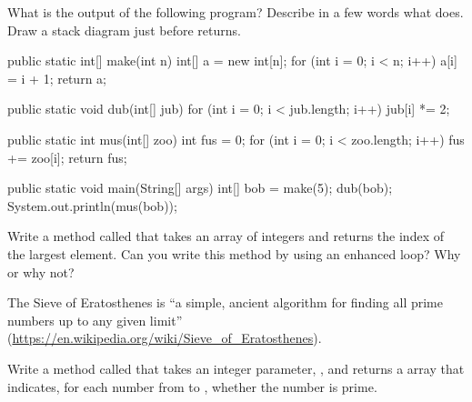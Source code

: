 \begin{exercise}  %

What is the output of the following program?
Describe in a few words what  does.
Draw a stack diagram just before  returns.

\begin{code}
public static int[] make(int n) {
    int[] a = new int[n];
    for (int i = 0; i < n; i++) {
        a[i] = i + 1;
    }
    return a;
}
\end{code}

\begin{code}
public static void dub(int[] jub) {
    for (int i = 0; i < jub.length; i++) {
        jub[i] *= 2;
    }
}
\end{code}

\begin{code}
public static int mus(int[] zoo) {
    int fus = 0;
    for (int i = 0; i < zoo.length; i++) {
        fus += zoo[i];
    }
    return fus;
}
\end{code}

\begin{code}
public static void main(String[] args) {
    int[] bob = make(5);
    dub(bob);
    System.out.println(mus(bob));
}
\end{code}

\end{exercise}


\begin{exercise}  %

Write a method called  that takes an array of integers and returns the index of the largest element.
Can you write this method by using an enhanced  loop?
Why or why not?

\end{exercise}


\begin{exercise}  %

The Sieve of Eratosthenes is ``a simple, ancient algorithm for finding all prime numbers up to any given limit'' (\url{https://en.wikipedia.org/wiki/Sieve_of_Eratosthenes}).

Write a method called  that takes an integer parameter, , and returns a  array that indicates, for each number from  to , whether the number is prime.

\end{exercise}


